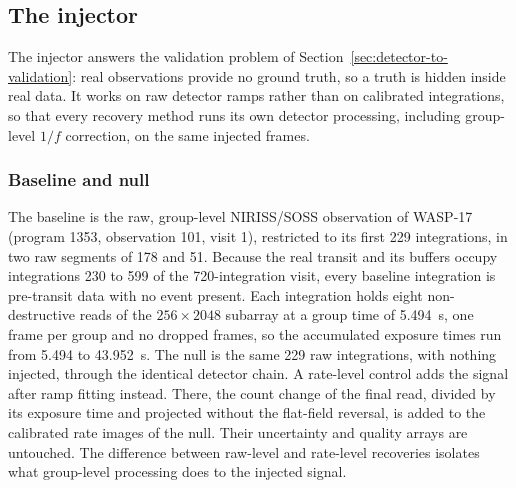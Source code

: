 \subsection{The injector}
\label{sec:injector}


The injector answers the validation problem of
Section~\ref{sec:detector-to-validation}: real observations provide no
ground truth, so a truth is hidden inside real data. It works on raw
detector ramps rather than on calibrated integrations, so that every
recovery method runs its own detector processing, including group-level
$1/f$ correction, on the same injected frames.

\subsubsection{Baseline and null}


The baseline is the raw, group-level NIRISS/SOSS observation of WASP-17
(program 1353, observation 101, visit 1), restricted to its first 229
integrations, in two raw segments of 178 and 51. Because the real
transit and its buffers occupy integrations 230 to 599 of the
720-integration visit, every baseline integration is pre-transit data
with no event present. Each integration holds eight non-destructive
reads of the $256\times2048$ subarray at a group time of 5.494~s, one
frame per group and no dropped frames, so the accumulated exposure times
run from 5.494 to 43.952~s. The null is the same 229 raw integrations,
with nothing injected, through the identical detector chain. A
rate-level control adds the signal after ramp fitting instead. There,
the count change of the final read, divided by its exposure time and
projected without the flat-field reversal, is added to the calibrated
rate images of the null. Their uncertainty and quality arrays are
untouched. The difference between raw-level and rate-level recoveries
isolates what group-level processing does to the injected signal.

